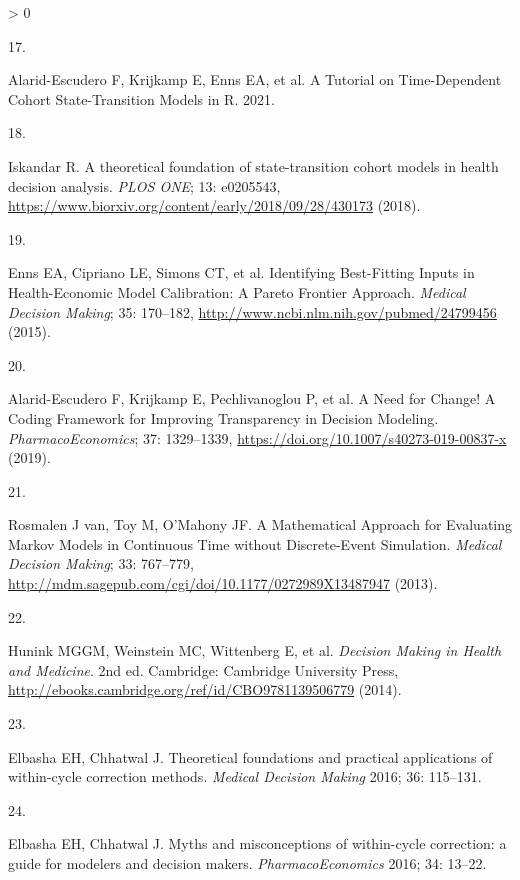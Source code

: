 \documentclass[
]{article}
\newlength{\cslhangindent}
\newlength{\csllabelwidth}
\newenvironment{CSLReferences}[2] %
 {%
  \setlength{\parindent}{0pt}
  \ifodd #1 \everypar{\setlength{\hangindent}{\cslhangindent}}\ignorespaces\fi
  \ifnum #2 > 0
  \setlength{\parskip}{#2\baselineskip}
  \fi
 }%
 {}
\newcommand{\CSLLeftMargin}[1]{\parbox[t]{\csllabelwidth}{#1}}
\newcommand{\CSLRightInline}[1]{\parbox[t]{\linewidth - \csllabelwidth}{#1}\break}
\begin{document}
\begin{CSLReferences}{0}{0}
\leavevmode\hypertarget{ref-Alarid-Escudero2021b}{}%
\CSLLeftMargin{17. }
\CSLRightInline{Alarid-Escudero F, Krijkamp E, Enns EA, et al. {A Tutorial on Time-Dependent Cohort State-Transition Models in R}. 2021.}

\leavevmode\hypertarget{ref-Iskandar2018a}{}%
\CSLLeftMargin{18. }
\CSLRightInline{Iskandar R. {A theoretical foundation of state-transition cohort models in health decision analysis}. \emph{PLOS ONE}; 13: e0205543, \url{https://www.biorxiv.org/content/early/2018/09/28/430173} (2018).}

\leavevmode\hypertarget{ref-Enns2015e}{}%
\CSLLeftMargin{19. }
\CSLRightInline{Enns EA, Cipriano LE, Simons CT, et al. {Identifying Best-Fitting Inputs in Health-Economic Model Calibration: A Pareto Frontier Approach}. \emph{Medical Decision Making}; 35: 170--182, \url{http://www.ncbi.nlm.nih.gov/pubmed/24799456} (2015).}

\leavevmode\hypertarget{ref-Alarid-Escudero2019e}{}%
\CSLLeftMargin{20. }
\CSLRightInline{Alarid-Escudero F, Krijkamp E, Pechlivanoglou P, et al. {A Need for Change! A Coding Framework for Improving Transparency in Decision Modeling}. \emph{PharmacoEconomics}; 37: 1329--1339, \url{https://doi.org/10.1007/s40273-019-00837-x} (2019).}

\leavevmode\hypertarget{ref-VanRosmalen2013}{}%
\CSLLeftMargin{21. }
\CSLRightInline{Rosmalen J van, Toy M, O'Mahony JF. {A Mathematical Approach for Evaluating Markov Models in Continuous Time without Discrete-Event Simulation}. \emph{Medical Decision Making}; 33: 767--779, \url{http://mdm.sagepub.com/cgi/doi/10.1177/0272989X13487947} (2013).}

\leavevmode\hypertarget{ref-Hunink2014}{}%
\CSLLeftMargin{22. }
\CSLRightInline{Hunink MGGM, Weinstein MC, Wittenberg E, et al. \emph{{Decision Making in Health and Medicine}}. 2nd ed. Cambridge: Cambridge University Press, \url{http://ebooks.cambridge.org/ref/id/CBO9781139506779} (2014).}

\leavevmode\hypertarget{ref-Elbasha2016}{}%
\CSLLeftMargin{23. }
\CSLRightInline{Elbasha EH, Chhatwal J. {Theoretical foundations and practical applications of within-cycle correction methods}. \emph{Medical Decision Making} 2016; 36: 115--131.}

\leavevmode\hypertarget{ref-Elbasha2016a}{}%
\CSLLeftMargin{24. }
\CSLRightInline{Elbasha EH, Chhatwal J. {Myths and misconceptions of within-cycle correction: a guide for modelers and decision makers}. \emph{PharmacoEconomics} 2016; 34: 13--22.}


\end{CSLReferences}
\end{document}
